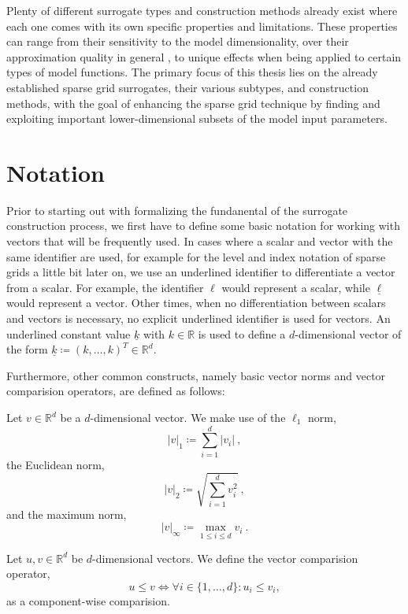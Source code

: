 \documentclass[
  a4paper,  %
  twoside,  %
  bibliography=totoc,
  headsepline,
  cleardoublepage=empty,
  parskip=half,
  draft=false
]{scrbook}
\begin{document}
Plenty of different surrogate types and construction methods already exist where each one comes with its own specific properties and limitations.
These properties can range from their sensitivity to the model dimensionality, over their approximation quality in general , to unique effects when being applied to certain types of model functions. 
The primary focus of this thesis lies on the already established sparse grid surrogates, their various subtypes, and construction methods, with the goal of enhancing the sparse grid technique by finding and exploiting important lower-dimensional subsets of the model input parameters.

\newpage
\section{Notation}

Prior to starting out with formalizing the fundanental of the surrogate construction process, we first have to define some basic notation for working with vectors that will be frequently used.
In cases where a scalar and vector with the same identifier are used, for example for the level and index notation of sparse grids a little bit later on, we use an underlined identifier to differentiate a vector from a scalar.
For example, the identifier $\ell$ would represent a scalar, while $\underline{\ell}$ would represent a vector.
Other times, when no differentiation between scalars and vectors is necessary, no explicit underlined identifier is used for vectors. 
An underlined constant value $\underline{k}$ with $k \in\mathds{R}$ is used to define a $d$-dimensional vector of the form $\underline{k} \coloneqq (k, \dots, k)^T \in \mathds{R}^d$.

Furthermore, other common constructs, namely basic vector norms and vector comparision operators, are defined as follows:
\begin{definition}
Let $v \in \mathds{R}^d$ be a $d$-dimensional vector.
We make use of the $\ell_1$ norm,
\begin{equation}
|v|_1 \coloneqq \sum_{i=1}^d |v_i| ~,
\end{equation}
the Euclidean norm,
\begin{equation}
|v|_2 \coloneqq \sqrt{\sum_{i=1}^d v_i^2} ~,
\end{equation}
and the maximum norm,
\begin{equation}
|v|_\infty \coloneqq \max_{1 \leq i \leq d} v_i ~.
\end{equation}
\end{definition}
%
\begin{definition}
Let $u, v \in \mathds{R}^d$ be $d$-dimensional vectors.
We define the vector comparision operator,
\begin{equation}
u \leq v \Leftrightarrow \forall i \in \{1,\dots,d\} \colon u_i \leq v_i,
\end{equation}
as a component-wise comparision.
\end{definition}
\end{document}

